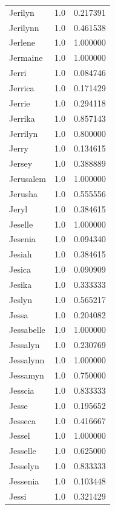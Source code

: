 \documentclass[
  letterpaper,
  DIV=11,
  numbers=noendperiod]{scrreprt}
\begin{document}
\begin{tabular}{lrr}
Jerilyn         &   1.0 &   0.217391 \\
Jerilynn        &   1.0 &   0.461538 \\
Jerlene         &   1.0 &   1.000000 \\
Jermaine        &   1.0 &   1.000000 \\
Jerri           &   1.0 &   0.084746 \\
Jerrica         &   1.0 &   0.171429 \\
Jerrie          &   1.0 &   0.294118 \\
Jerrika         &   1.0 &   0.857143 \\
Jerrilyn        &   1.0 &   0.800000 \\
Jerry           &   1.0 &   0.134615 \\
Jersey          &   1.0 &   0.388889 \\
Jerusalem       &   1.0 &   1.000000 \\
Jerusha         &   1.0 &   0.555556 \\
Jeryl           &   1.0 &   0.384615 \\
Jeselle         &   1.0 &   1.000000 \\
Jesenia         &   1.0 &   0.094340 \\
Jesiah          &   1.0 &   0.384615 \\
Jesica          &   1.0 &   0.090909 \\
Jesika          &   1.0 &   0.333333 \\
Jeslyn          &   1.0 &   0.565217 \\
Jessa           &   1.0 &   0.204082 \\
Jessabelle      &   1.0 &   1.000000 \\
Jessalyn        &   1.0 &   0.230769 \\
Jessalynn       &   1.0 &   1.000000 \\
Jessamyn        &   1.0 &   0.750000 \\
Jesscia         &   1.0 &   0.833333 \\
Jesse           &   1.0 &   0.195652 \\
Jesseca         &   1.0 &   0.416667 \\
Jessel          &   1.0 &   1.000000 \\
Jesselle        &   1.0 &   0.625000 \\
Jesselyn        &   1.0 &   0.833333 \\
Jessenia        &   1.0 &   0.103448 \\
Jessi           &   1.0 &   0.321429 \\

\end{tabular}
\end{document}
